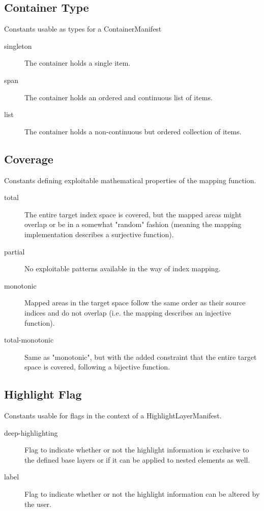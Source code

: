 \documentclass[11pt,a4paper]{report}
\begin{document}
\subsection{Container Type}
Constants usable as types for a ContainerManifest
\label{sec:enum-container-type}
\begin{description}
	\item[singleton] The container holds a single item.
	\item[span] The container holds an ordered and continuous list of items.
	\item[list] The container holds a non-continuous but ordered collection of items.
\end{description}

\subsection{Coverage}
Constants defining exploitable mathematical properties of the mapping function.
\label{sec:enum-coverage}
\begin{description}
	\item[total] The entire target index space is covered, but the mapped areas might overlap or be in a somewhat "random" fashion (meaning the mapping implementation describes a surjective function).
	\item[partial] No exploitable patterns available in the way of index mapping.
	\item[monotonic] Mapped areas in the target space follow the same order as their source indices and do not overlap (i.e. the mapping describes an injective function).
	\item[total-monotonic] Same as "monotonic", but with the added constraint that the entire target space is covered, following a bijective function.
\end{description}

\subsection{Highlight Flag}
Constants usable for flags in the context of a HighlightLayerManifest.
\label{sec:enum-highlight-flag}
\begin{description}
	\item[deep-highlighting] Flag to indicate whether or not the highlight information is exclusive to the defined base layers or if it can be applied to nested elements as well.
	\item[label] Flag to indicate whether or not the highlight information can be altered by the user.
\end{description}
\end{document}

